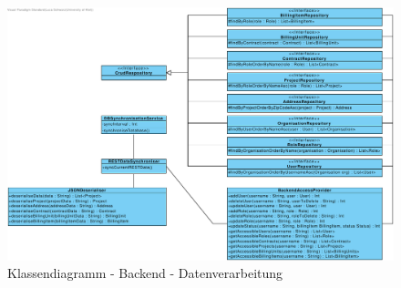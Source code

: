 \begin{figure}[h]
	\centering
	\includegraphics[width=\linewidth]{img/diagrams/Backend.pdf}
	\caption{Klassendiagramm - Backend - Datenverarbeitung}
	\label{fig:klassendiagramm-backend-data}
\end{figure}

